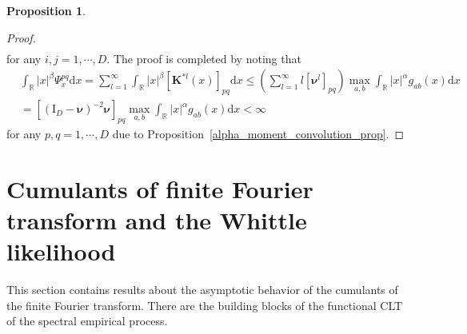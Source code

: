 \documentclass[11pt]{article}
\numberwithin{equation}{section}
\theoremstyle{plain}
\theoremstyle{definition}
\theoremstyle{definition}
\theoremstyle{assumption}
\theoremstyle{proposition}
\newtheorem{proposition}{Proposition}[section]
\theoremstyle{proposition}
\theoremstyle{example}
\theoremstyle{lemma}
\theoremstyle{theorem}
\theoremstyle{remark}
\begin{document}
\begin{proposition}
\begin{proof}
\begin{align*}
\end{align*}
for any $i,j=1,\cdots,D$. The proof is completed by noting that
\begin{align*}
&\int_{\mathbb{R}}|x|^{\beta} \Psi_{x}^{pq} \mathrm{d}x
=\sum_{l=1}^{\infty} \int_{\mathbb{R}}|x|^{\beta} [\boldsymbol{K}^{* l}(x)]_{pq} \mathrm{d}x
\leqslant \left(\sum_{l=1}^{\infty} l[\boldsymbol{\nu}^l]_{pq}\right)\max_{a,b}\int_{\mathbb{R}}|x|^{\alpha}g_{ab}(x)\mathrm{d}x \\
&=[(\boldsymbol{\mathrm{I}}_{D} - \boldsymbol{\nu})^{-2}\boldsymbol{\nu}]_{pq}\max_{a,b}\int_{\mathbb{R}}|x|^{\alpha}g_{ab}(x)\mathrm{d}x
<\infty
\end{align*}
for any $p,q=1,\cdots,D$ due to Proposition~\ref{alpha_moment_convolution_prop}.
\end{proof}
\end{proposition}


\section{Cumulants of finite Fourier transform and the Whittle likelihood}\label{decomp_periodogram_sect}
This section contains results about the asymptotic behavior of the cumulants of the finite Fourier transform. There are the building blocks of the functional CLT of the spectral empirical process.
\end{document}
